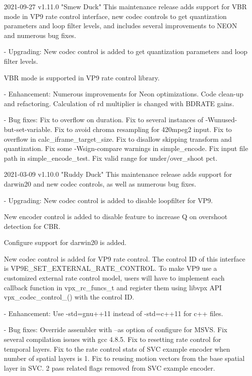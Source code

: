 
\begin{DoxyVerbInclude}
2021-09-27 v1.11.0 "Smew Duck"
  This maintenance release adds support for VBR mode in VP9 rate control
  interface, new codec controls to get quantization parameters and loop filter
  levels, and includes several improvements to NEON and numerous bug fixes.

  - Upgrading:
    New codec control is added to get quantization parameters and loop filter
    levels.

    VBR mode is supported in VP9 rate control library.

  - Enhancement:
    Numerous improvements for Neon optimizations.
    Code clean-up and refactoring.
    Calculation of rd multiplier is changed with BDRATE gains.

  - Bug fixes:
    Fix to overflow on duration.
    Fix to several instances of -Wunused-but-set-variable.
    Fix to avoid chroma resampling for 420mpeg2 input.
    Fix to overflow in calc_iframe_target_size.
    Fix to disallow skipping transform and quantization.
    Fix some -Wsign-compare warnings in simple_encode.
    Fix input file path in simple_encode_test.
    Fix valid range for under/over_shoot pct.

2021-03-09 v1.10.0 "Ruddy Duck"
  This maintenance release adds support for darwin20 and new codec controls, as
  well as numerous bug fixes.

  - Upgrading:
    New codec control is added to disable loopfilter for VP9.

    New encoder control is added to disable feature to increase Q on overshoot
    detection for CBR.

    Configure support for darwin20 is added.

    New codec control is added for VP9 rate control. The control ID of this
    interface is VP9E_SET_EXTERNAL_RATE_CONTROL. To make VP9 use a customized
    external rate control model, users will have to implement each callback
    function in vpx_rc_funcs_t and register them using libvpx API
    vpx_codec_control_() with the control ID.

  - Enhancement:
    Use -std=gnu++11 instead of -std=c++11 for c++ files.

  - Bug fixes:
    Override assembler with --as option of configure for MSVS.
    Fix several compilation issues with gcc 4.8.5.
    Fix to resetting rate control for temporal layers.
    Fix to the rate control stats of SVC example encoder when number of spatial
    layers is 1.
    Fix to reusing motion vectors from the base spatial layer in SVC.
    2 pass related flags removed from SVC example encoder.


\end{DoxyVerbInclude}

